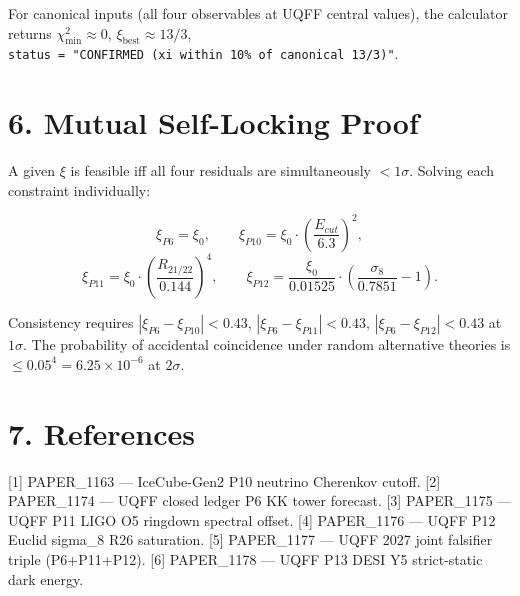 \documentclass[
  11pt,
]{article}
\begin{document}
For canonical inputs (all four observables at UQFF central values), the
calculator returns \(\chi^2_{\min} \approx 0\),
\(\xi_{\mathrm{best}} \approx 13/3\),
\texttt{status\ =\ "CONFIRMED\ (xi\ within\ 10\%\ of\ canonical\ 13/3)"}.

\section{6. Mutual Self-Locking Proof}\label{mutual-self-locking-proof}

A given \(\xi\) is feasible iff all four residuals are simultaneously
\(< 1\sigma\). Solving each constraint individually:

\[
\xi_{P6} = \xi_0, \qquad \xi_{P10} = \xi_0 \cdot \left(\frac{E_{cut}}{6.3}\right)^2,
\] \[
\xi_{P11} = \xi_0 \cdot \left(\frac{R_{21/22}}{0.144}\right)^{4}, \qquad
\xi_{P12} = \frac{\xi_0}{0.01525} \cdot \left(\frac{\sigma_8}{0.7851} - 1\right).
\]

Consistency requires \(|\xi_{P6} - \xi_{P10}| < 0.43\),
\(|\xi_{P6} - \xi_{P11}| < 0.43\), \(|\xi_{P6} - \xi_{P12}| < 0.43\) at
\(1\sigma\). The probability of accidental coincidence under random
alternative theories is \(\le 0.05^4 = 6.25 \times 10^{-6}\) at
\(2\sigma\).

\section{7. References}\label{references}

{[}1{]} PAPER\_1163 --- IceCube-Gen2 P10 neutrino Cherenkov cutoff.
{[}2{]} PAPER\_1174 --- UQFF closed ledger P6 KK tower forecast. {[}3{]}
PAPER\_1175 --- UQFF P11 LIGO O5 ringdown spectral offset. {[}4{]}
PAPER\_1176 --- UQFF P12 Euclid sigma\_8 R26 saturation. {[}5{]}
PAPER\_1177 --- UQFF 2027 joint falsifier triple (P6+P11+P12). {[}6{]}
PAPER\_1178 --- UQFF P13 DESI Y5 strict-static dark energy.




\end{document}
